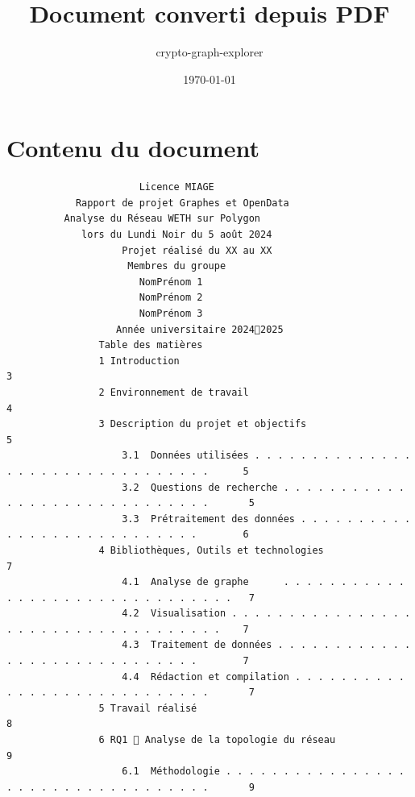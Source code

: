 \documentclass[12pt]{article}
\title{Document converti depuis PDF}
\author{crypto-graph-explorer}
\date{\today}
\begin{document}
\maketitle

\tableofcontents
\newpage

\section{Contenu du document}

\begin{verbatim}
                       Licence MIAGE
            Rapport de projet Graphes et OpenData
          Analyse du Réseau WETH sur Polygon
             lors du Lundi Noir du 5 août 2024
                    Projet réalisé du XX au XX
                     Membres du groupe
                       NomPrénom 1
                       NomPrénom 2
                       NomPrénom 3
                   Année universitaire 20242025
                Table des matières
                1 Introduction                                                                                  3
                2 Environnement de travail                                                                      4
                3 Description du projet et objectifs                                                            5
                    3.1  Données utilisées . . . . . . . . . . . . . . . . . . . . . . . . . . . . . . . .      5
                    3.2  Questions de recherche . . . . . . . . . . . . . . . . . . . . . . . . . . . . .       5
                    3.3  Prétraitement des données . . . . . . . . . . . . . . . . . . . . . . . . . . .        6
                4 Bibliothèques, Outils et technologies                                                         7
                    4.1  Analyse de graphe      . . . . . . . . . . . . . . . . . . . . . . . . . . . . . . .   7
                    4.2  Visualisation . . . . . . . . . . . . . . . . . . . . . . . . . . . . . . . . . . .    7
                    4.3  Traitement de données . . . . . . . . . . . . . . . . . . . . . . . . . . . . .        7
                    4.4  Rédaction et compilation . . . . . . . . . . . . . . . . . . . . . . . . . . . .       7
                5 Travail réalisé                                                                               8
                6 RQ1  Analyse de la topologie du réseau                                                       9
                    6.1  Méthodologie . . . . . . . . . . . . . . . . . . . . . . . . . . . . . . . . . .       9

\end{verbatim}
\end{document}
